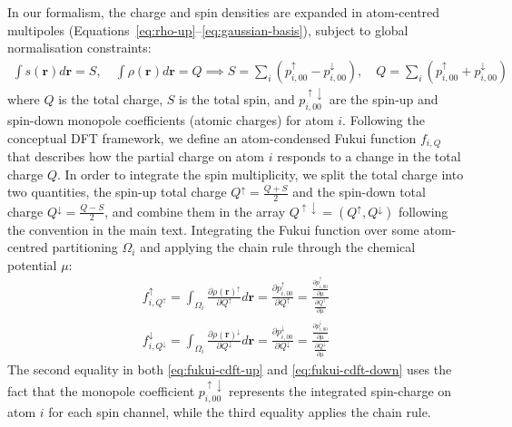 \documentclass[aps,%
superscriptaddress,
 amsmath,amssymb,
floatfix,
twocolumn
]{revtex4-2}
\begin{document}
In our formalism, the charge and spin densities are expanded in atom-centred multipoles (Equations~\ref{eq:rho-up}--\ref{eq:gaussian-basis}), subject to global normalisation constraints:
\begin{align}
    \int s(\mathbf{r})d\mathbf{r} = S, \quad \int \rho(\mathbf{r})d\mathbf{r} = Q \implies S = \sum_i \left(p_{i,00}^{\uparrow} - p_{i,00}^{\downarrow}\right), \quad  Q = \sum_i \left(p_{i,00}^{\uparrow} + p_{i,00}^{\downarrow}\right)
\end{align}
where $Q$ is the total charge, $S$ is the total spin, and $p_{i,00}^{\uparrow\downarrow}$ are the spin-up and spin-down monopole coefficients (atomic charges) for atom $i$. Following the conceptual DFT framework, we define an atom-condensed Fukui function $f_{i,Q}$ that describes how the partial charge on atom $i$ responds to a change in the total charge $Q$. In order to integrate the spin multiplicity, we split the total charge into two quantities, the spin-up total charge $Q^{\uparrow}=\frac{Q + S}{2}$ and the spin-down total charge $Q^{\downarrow}=\frac{Q - S}{2}$, and combine them in the array $Q^{\uparrow\downarrow} = (Q^{\uparrow}, Q^{\downarrow})$ following the convention in the main text. Integrating the Fukui function over some atom-centred partitioning $\Omega_i$ and applying the chain rule through the chemical potential $\mu$:
\begin{align}
    f_{i,Q^{\uparrow}}^{\uparrow} = \int_{\Omega_i} \frac{\partial \rho(\mathbf{r})^{\uparrow}}{\partial Q^{\uparrow}} d\mathbf{r} = \frac{\partial p_{i,00}^{\uparrow}}{\partial Q^{\uparrow}} = \frac{\frac{\partial p_{i,00}^{\uparrow}}{\partial \mu}}{\frac{\partial Q^{\uparrow}}{\partial \mu}} 
    \label{eq:fukui-cdft-up}
    \\
    f_{i,Q^{\downarrow}}^{\downarrow} = \int_{\Omega_i} \frac{\partial \rho(\mathbf{r})^{\downarrow}}{\partial Q^{\downarrow}} d\mathbf{r} = \frac{\partial p_{i,00}^{\downarrow}}{\partial Q^{\downarrow}} = \frac{\frac{\partial p_{i,00}^{\downarrow}}{\partial \mu}}{\frac{\partial Q^{\downarrow}}{\partial \mu}}
    \label{eq:fukui-cdft-down}
\end{align}
The second equality in both \ref{eq:fukui-cdft-up} and \ref{eq:fukui-cdft-down} uses the fact that the monopole coefficient $p_{i,00}^{\uparrow \downarrow}$ represents the integrated spin-charge on atom $i$ for each spin channel, while the third equality applies the chain rule.
\end{document}
